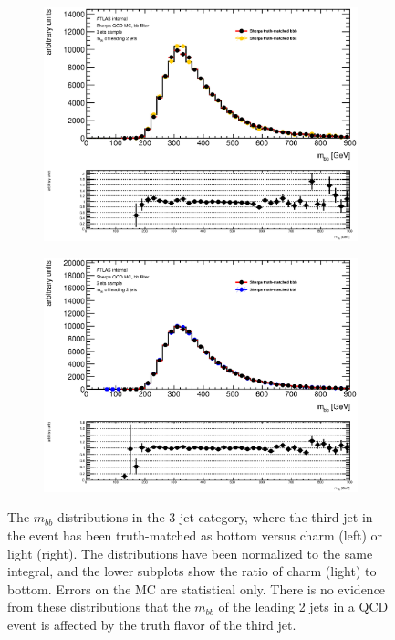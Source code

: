 \begin{figure}[phtb!]
  \begin{center}
  \begin{subfigure}[$BBB$ vs $BBC$, 3 jet category]{0.45\textwidth}\includegraphics[width=\textwidth]{MonteCarlo/figures/mbb_bbB_3jets_bbB_bbC.eps}\end{subfigure}
  \begin{subfigure}[$BBB$ vs $BBL$, 3 jet category]{0.45\textwidth}\includegraphics[width=\textwidth]{MonteCarlo/figures/mbb_bbB_3jets_bbB_bbL.eps}\end{subfigure}
  \caption{The $m_{bb}$ distributions in the 3 jet category, where the third jet in the event has been 
  truth-matched as bottom versus charm (left) or light (right).  The distributions have been normalized to 
  the same integral, and the lower subplots show the ratio of charm (light) to bottom.  Errors on the MC
  are statistical only.  There is no evidence from these distributions that the $m_{bb}$ of the leading
  2 jets in a QCD event is affected by the truth flavor of the third jet. 
  \label{fig:mbb_bb_qcd_mc}}
    \end{center}
\end{figure}








